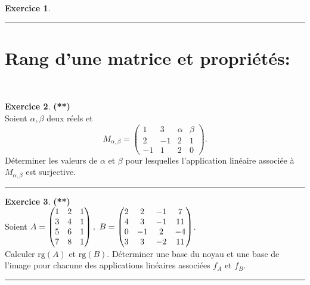\documentclass[a4paper,11pt]{article}
\theoremstyle{definition}
\newtheorem{exo}{Exercice} %
\begin{document}
\begin{minipage}{1\linewidth}
\begin{minipage}[t]{0.48\linewidth}
\begin{exo}
			\centering\rule{1\linewidth}{0.6pt}\end{exo}
		
		
	
		
		
\end{minipage}\end{minipage}

\section*{Rang d'une matrice et propriétés:}\hfill\\%


\begin{minipage}{1\linewidth}\begin{minipage}[t]{0.48\linewidth}\raggedright

		
		\begin{exo}\textbf{(**)}\quad\\[0.2cm]
			Soient $\alpha,\beta$ deux réels et 
			$$M_{\alpha,\beta}=\left(\begin{array}{cccc}
			1&3&\alpha&\beta\\
			2&-1&2&1\\
			-1&1&2&0
			\end{array}\right).$$
			Déterminer les valeurs de $\alpha$ et $\beta$ pour lesquelles l'application linéaire associée à $M_{\alpha,\beta}$
			est surjective.
			
			\centering\rule{1\linewidth}{0.6pt}\end{exo}
		
		
		

		
		
	\end{minipage}\hfill\vrule\hfill\begin{minipage}[t]{0.48\linewidth}\raggedright
		
		
				
		\begin{exo}\textbf{(**)}\quad\\[0.2cm]
			Soient  
			$A=\begin{pmatrix} 
			1 & 2 & 1 \cr
			3 & 4 & 1 \cr
			5 & 6 & 1 \cr
			7 & 8 & 1 \cr
			\end{pmatrix},\ 
			B=\begin{pmatrix} 
			2 & 2 & -1 & 7  \cr
			4 & 3 & -1 & 11 \cr
			0 & -1 & 2 & -4 \cr
			3 & 3 & -2 & 11 \cr 
			\end{pmatrix} $.\quad\\[0.2cm]
			Calculer $\textrm{rg}(A)$ et $\textrm{rg}(B)$. Déterminer une base du
			noyau et une base de l'image pour chacune des applications linéaires associées $f_A$ et $f_B$.
			
			\centering\rule{1\linewidth}{0.6pt}\end{exo}
		
		
\end{minipage}\end{minipage} \newpage
\end{document}
